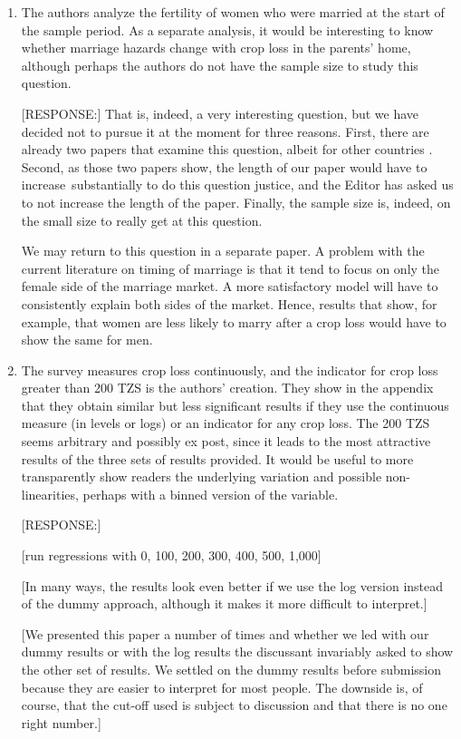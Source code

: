 \documentclass[letterpaper,12pt]{article}
\begin{document}
\begin{enumerate}
\item The authors analyze the fertility of women who were married at the
start of the sample period. As a separate analysis, it would be
interesting to know whether marriage hazards change with crop loss in
the parents' home, although perhaps the authors do not have the sample
size to study this question.

[RESPONSE:] That is, indeed, a very interesting question, but we have 
decided not to pursue it at the moment for three reasons.
First, there are already two papers that examine this question, 
albeit for other countries \citet{mbiti2008,Hoogeveen2011}.
Second, as those two papers show, the length of our paper would have
to increase substantially to do this question justice, and the Editor
has asked us to not increase the length of the paper.
Finally, the sample size is, indeed, on the small size to really get 
at this question.

We may return to this question in a separate paper.
A problem with the current literature on timing of marriage
is that it tend to focus on only the female side of the marriage market.
A more satisfactory model will have to consistently explain both sides 
of the market.
Hence, results that show, for example, that women are less likely to
marry after a crop loss would have to show the same for men. 


\item The survey measures crop loss continuously, and the indicator for
crop loss greater than 200 TZS is the authors' creation. They show in
the appendix that they obtain similar but less significant results if
they use the continuous measure (in levels or logs) or an indicator for
any crop loss. The 200 TZS seems arbitrary and possibly ex post, since
it leads to the most attractive results of the three sets of results
provided. It would be useful to more transparently show readers the
underlying variation and possible non-linearities, perhaps with a binned
version of the variable.

[RESPONSE:]

[run regressions with 0, 100, 200, 300, 400, 500, 1,000]

[In many ways, the results look even better if we use the log version
instead of the dummy approach, although it makes it more difficult
to interpret.]

[We presented this paper a number of times and whether we led with
our dummy results or with the log results the discussant invariably 
asked to show the other set of results.
We settled on the dummy results before submission because they are
easier to interpret for most people.
The downside is, of course, that the cut-off used is subject to
discussion and that there is no one right number.]


\end{enumerate}
\end{document}
